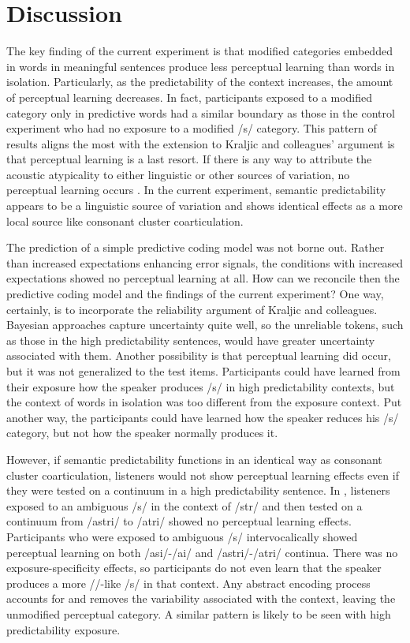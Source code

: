 \section{Discussion}

The key finding of the current experiment is that modified categories embedded in words in meaningful sentences produce less perceptual learning than words in isolation.  
Particularly, as the predictability of the context increases, the amount of perceptual learning decreases.  
In fact, participants exposed to a modified category only in predictive words had a similar boundary as those in the control experiment who had no exposure to a modified /s/ category.
This pattern of results aligns the most with the extension to Kraljic and colleagues' argument is that perceptual learning is a last resort.
If there is any way to attribute the acoustic atypicality to either linguistic or other sources of variation, no perceptual learning occurs \citep{Kraljic2008,Kraljic2008a}.
In the current experiment, semantic predictability appears to be a linguistic source of variation and shows identical effects as a more local source like consonant cluster coarticulation.

The prediction of a simple predictive coding model \citep{Clark2013} was not borne out.
Rather than increased expectations enhancing error signals, the conditions with increased expectations showed no perceptual learning at all.
How can we reconcile then the predictive coding model and the findings of the current experiment?
One way, certainly, is to incorporate the reliability argument of Kraljic and colleagues.
Bayesian approaches capture uncertainty quite well, so the unreliable tokens, such as those in the high predictability sentences, would have greater uncertainty associated with them.
Another possibility is that perceptual learning did occur, but it was not generalized to the test items.
Participants could have learned from their exposure how the speaker produces /s/ in high predictability contexts, but the context of words in isolation was too different from the exposure context.
Put another way, the participants could have learned how the speaker reduces his /s/ category, but not how the speaker normally produces it.

However, if semantic predictability functions in an identical way as consonant cluster coarticulation, listeners would not show perceptual learning effects even if they were tested on a continuum in a high predictability sentence.
In \citet{Kraljic2008a}, listeners exposed to an ambiguous /s/ in the context of /str/ and then tested on a continuum from /astri/ to /a\textesh tri/ showed no perceptual learning effects.
Participants who were exposed to ambiguous /s/ intervocalically showed perceptual learning on both /asi/-/a\textesh i/ and /astri/-/a\textesh tri/ continua.
There was no exposure-specificity effects, so participants do not even learn that the speaker produces a more /\textesh/-like /s/ in that context.
Any abstract encoding process accounts for and removes the variability associated with the context, leaving the unmodified perceptual category.
A similar pattern is likely to be seen with high predictability exposure.

